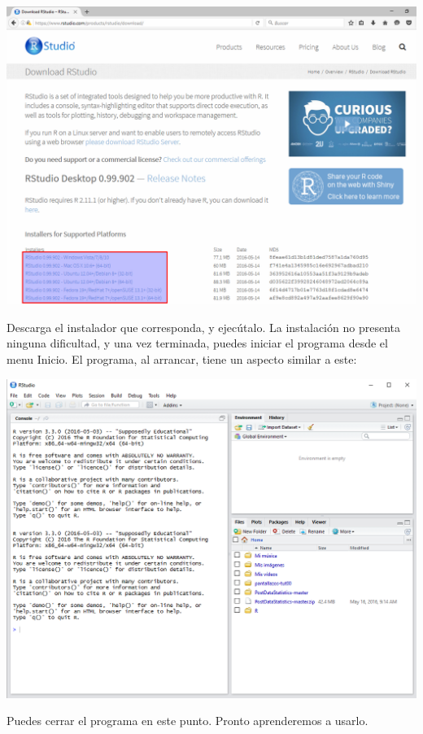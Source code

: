 \documentclass[10pt,a4paper]{article}
\begin{document}
    \begin{center}
    \includegraphics[width=15cm]{../fig/Tut00-43.png}
    \end{center}
Descarga el instalador que corresponda, y ejecútalo. La instalación no presenta ninguna dificultad,
y una vez terminada, puedes iniciar el programa desde el menu Inicio. El programa, al arrancar,
tiene un aspecto similar a este:
    \begin{center}
    \includegraphics[width=15cm]{../fig/Tut00-44.png}
    \end{center}
Puedes cerrar el programa en este punto. Pronto aprenderemos a usarlo.
\end{document}
